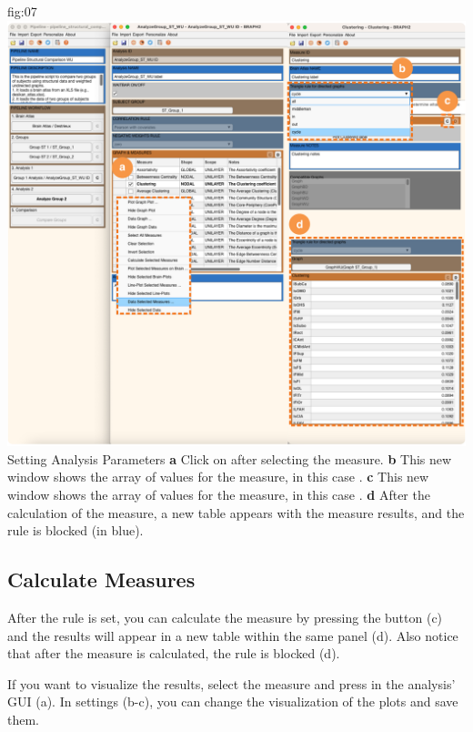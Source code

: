 \documentclass[justified]{tufte-handout}
\begin{document}

	{fig:07}
	{\includegraphics{fig07.jpg}}
	{Setting Analysis Parameters}
	{
	{\bf a} Click on  after selecting the measure.
	{\bf b} This new window shows the array of values for the measure, in this case .
 	{\bf c} This new window shows the array of values for the measure, in this case .
 	{\bf d} After the calculation of the measure, a new table appears with the measure results, and the rule is blocked (in blue).
	}

 
\subsection{Calculate Measures}
After the rule is set, you can calculate the measure by pressing the  button (c) and the results will appear in a new table within the same panel (d). Also notice that after the measure is calculated, the rule is blocked (d).
 
If you want to visualize the results, select the measure and press  in the analysis' GUI (a). In settings (b-c), you can change the visualization of the plots and save them. 
 
\end{document}
